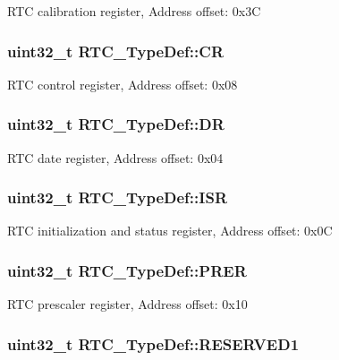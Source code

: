 R\-T\-C calibration register, Address offset\-: 0x3\-C \hypertarget{struct_r_t_c___type_def_a731d9209ce40dce6ea61fcc6f818c892}{
\subsubsection[{C\-R}]{ uint32\-\_\-t R\-T\-C\-\_\-\-Type\-Def\-::\-C\-R}}\label{struct_r_t_c___type_def_a731d9209ce40dce6ea61fcc6f818c892}
R\-T\-C control register, Address offset\-: 0x08 \hypertarget{struct_r_t_c___type_def_a8750eae683cb3d382476dc7cdcd92b96}{
\subsubsection[{D\-R}]{ uint32\-\_\-t R\-T\-C\-\_\-\-Type\-Def\-::\-D\-R}}\label{struct_r_t_c___type_def_a8750eae683cb3d382476dc7cdcd92b96}
R\-T\-C date register, Address offset\-: 0x04 \hypertarget{struct_r_t_c___type_def_a5a7b104d80b48b5708b50cdc487d6a78}{
\subsubsection[{I\-S\-R}]{ uint32\-\_\-t R\-T\-C\-\_\-\-Type\-Def\-::\-I\-S\-R}}\label{struct_r_t_c___type_def_a5a7b104d80b48b5708b50cdc487d6a78}
R\-T\-C initialization and status register, Address offset\-: 0x0\-C \hypertarget{struct_r_t_c___type_def_a5f43a11e0873212f598e41db5f2dcf6a}{
\subsubsection[{P\-R\-E\-R}]{ uint32\-\_\-t R\-T\-C\-\_\-\-Type\-Def\-::\-P\-R\-E\-R}}\label{struct_r_t_c___type_def_a5f43a11e0873212f598e41db5f2dcf6a}
R\-T\-C prescaler register, Address offset\-: 0x10 \hypertarget{struct_r_t_c___type_def_a761d5a0c208032613dad3fcc674907b7}{
\subsubsection[{R\-E\-S\-E\-R\-V\-E\-D1}]{\setlength{\rightskip}{0pt plus 5cm}uint32\-\_\-t R\-T\-C\-\_\-\-Type\-Def\-::\-R\-E\-S\-E\-R\-V\-E\-D1}}\label{struct_r_t_c___type_def_a761d5a0c208032613dad3fcc674907b7}
